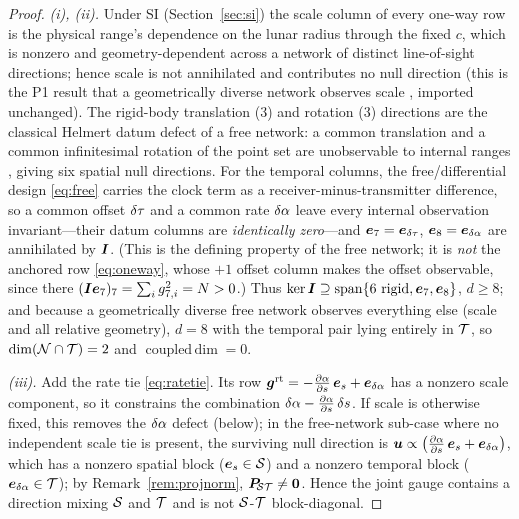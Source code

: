 \begin{proof}
\emph{(i), (ii).} Under SI (Section~\ref{sec:si}) the scale column of every one-way row is
the physical range's dependence on the lunar radius through the fixed $c$, which is nonzero
and geometry-dependent across a network of distinct line-of-sight directions; hence scale
is not annihilated and contributes no null direction (this is the P1 result that a
geometrically diverse network observes scale \citep{baweja2026datum}, imported unchanged).
The rigid-body translation ($3$) and rotation ($3$) directions are the classical Helmert
datum defect of a free network: a common translation and a common infinitesimal rotation of
the point set are unobservable to internal ranges \citep{baarda1973,teunissen2000}, giving
six spatial null directions. For the temporal columns, the free/differential design
\eqref{eq:free} carries the clock term as a receiver-minus-transmitter difference, so a
common offset $\delta\tau$ and a common rate $\delta\alpha$ leave every internal observation
invariant---their datum columns are \emph{identically zero}---and $\bm e_7=\bm e_{\delta\tau}$,
$\bm e_8=\bm e_{\delta\alpha}$ are annihilated by $\bm{I}$. (This is the defining property of the
free network; it is \emph{not} the anchored row \eqref{eq:oneway}, whose $+1$ offset column
makes the offset observable, since there $(\bm{I}\bm e_7)_7=\sum_i g_{7,i}^2=N>0$.) Thus
$\ker\bm{I}\supseteq\operatorname{span}\{\text{6 rigid},\bm e_7,\bm e_8\}$, $d\ge8$; and
because a geometrically diverse free network observes everything else (scale and all
relative geometry), $d=8$ with the temporal pair lying entirely in $\mathcal{T}$, so
$\dim(\mathcal{N}\cap\mathcal{T})=2$ and $\operatorname{coupled\,dim}=0$.

\emph{(iii).} Add the rate tie \eqref{eq:ratetie}. Its row
$\bm g^{\mathrm{rt}}=-\tfrac{\partial\alpha}{\partial s}\,\bm e_{s}+\bm e_{\delta\alpha}$ has a
nonzero scale component, so it constrains the combination
$\delta\alpha-\tfrac{\partial\alpha}{\partial s}\,\delta s$. If scale is otherwise fixed, this
removes the $\delta\alpha$ defect (below); in the free-network sub-case where no independent
scale tie is present, the surviving null direction is
$\bm u\propto\bigl(\tfrac{\partial\alpha}{\partial s}\,\bm e_{s}+\bm e_{\delta\alpha}\bigr)$,
which has a nonzero spatial block ($\bm e_s\in\mathcal{S}$) and a nonzero temporal block
($\bm e_{\delta\alpha}\in\mathcal{T}$); by Remark~\ref{rem:projnorm}, $\bm{P}_{\!\mathcal{S}\mathcal{T}}\neq\bm0$. Hence the joint
gauge contains a direction mixing $\mathcal{S}$ and $\mathcal{T}$ and is not $\mathcal{S}$-$\mathcal{T}$ block-diagonal.
\end{proof}

